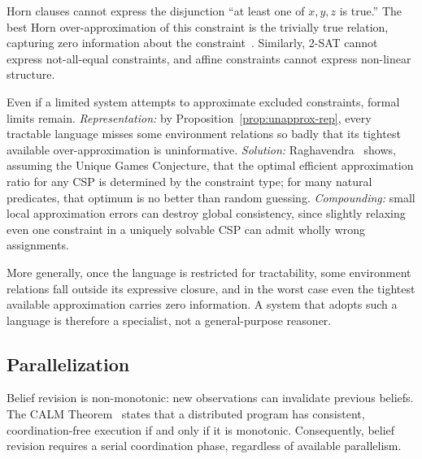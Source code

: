 \documentclass[runningheads]{llncs}
\begin{document}
\begin{example}\label{ex:horn}
Horn clauses cannot express the disjunction ``at least one of $x, y, z$ is true.'' The best Horn over-approximation of this constraint is the trivially true relation, capturing zero information about the constraint~\cite{SelmanKautz96}. Similarly, 2-SAT cannot express not-all-equal constraints, and affine constraints cannot express non-linear structure.
\end{example}

\begin{remark}\label{rem:approx-gap}
Even if a limited system attempts to approximate excluded constraints, formal limits remain. \emph{Representation:} by Proposition~\ref{prop:unapprox-rep}, every tractable language misses some environment relations so badly that its tightest available over-approximation is uninformative. \emph{Solution:} Raghavendra~\cite{Raghavendra08} shows, assuming the Unique Games Conjecture, that the optimal efficient approximation ratio for any CSP is determined by the constraint type; for many natural predicates, that optimum is no better than random guessing. \emph{Compounding:} small local approximation errors can destroy global consistency, since slightly relaxing even one constraint in a uniquely solvable CSP can admit wholly wrong assignments.
\end{remark}

More generally, once the language is restricted for tractability, some environment relations fall outside its expressive closure, and in the worst case even the tightest available approximation carries zero information. A system that adopts such a language is therefore a specialist, not a general-purpose reasoner.

\subsection{Parallelization}\label{sec:parallel}

\begin{remark}\label{rem:serial}
Belief revision is non-monotonic: new observations can invalidate previous beliefs.
The CALM Theorem~\cite{Hellerstein10} states that a distributed program has consistent, coordination-free execution if and only if it is monotonic.
Consequently, belief revision requires a serial coordination phase, regardless of available parallelism.
\end{remark}
\end{document}
